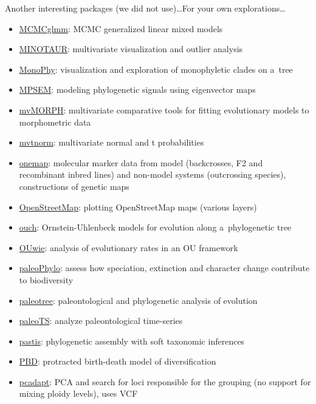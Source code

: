 \documentclass[compress, ucs, xelatex, 11pt, xcolor=svgnames, aspectratio=169,
	hyperref={
		bookmarks=true,
		unicode=true,
		colorlinks=true,
		pdftitle={Molecular data in R},
		plainpages=false,
		pdfauthor={Vojtech Zeisek},
		pdfsubject={Course about phylogeny and evolution in R},
		pdfcreator={XeLaTeX},
		pdfkeywords={R, evolution, phylogeny, molecular data},
		linkcolor=Crimson, %
		anchorcolor=Magenta, %
		citecolor=Magenta, %
		filecolor=Magenta, %
		menucolor=Magenta, %
		urlcolor=DodgerBlue, %
		pdftex},
	url={hyphens, lowtilde} %
	]{beamer}
\begin{document}
\begin{frame}[allowframebreaks]{Another interesting packages (we did not use)\ldots}{For your own explorations\ldots}
\begin{itemize}
		\item \href{https://CRAN.R-project.org/package=MCMCglmm}{MCMCglmm}: MCMC generalized linear mixed models
		\item \href{https://github.com/NESCent/MINOTAUR}{MINOTAUR}: multivariate visualization and outlier analysis
		\item \href{https://CRAN.R-project.org/package=MonoPhy}{MonoPhy}: visualization and exploration of monophyletic clades on a~tree
		\item \href{https://CRAN.R-project.org/package=MPSEM}{MPSEM}: modeling phylogenetic signals using eigenvector maps
		\item \href{https://CRAN.R-project.org/package=mvMORPH}{mvMORPH}: multivariate comparative tools for fitting evolutionary models to morphometric data
		\item \href{https://CRAN.R-project.org/package=mvtnorm}{mvtnorm}: multivariate normal and t probabilities
		\item \href{https://CRAN.R-project.org/package=onemap}{onemap}: molecular marker data from model (backcrosses, F2 and recombinant inbred lines) and non-model systems (outcrossing species), constructions of genetic maps
		\item \href{https://CRAN.R-project.org/package=OpenStreetMap}{OpenStreetMap}: plotting OpenStreetMap maps (various layers)
		\item \href{https://CRAN.R-project.org/package=ouch}{ouch}: Ornstein-Uhlenbeck models for evolution along a~phylogenetic tree
		\item \href{https://CRAN.R-project.org/package=OUwie}{OUwie}: analysis of evolutionary rates in an OU framework
		\item \href{https://r-forge.r-project.org/projects/paleophylo/}{paleoPhylo}: assess how speciation, extinction and character change contribute to biodiversity
		\item \href{https://CRAN.R-project.org/package=paleotree}{paleotree}: paleontological and phylogenetic analysis of evolution
		\item \href{https://CRAN.R-project.org/package=paleoTS}{paleoTS}: analyze paleontological time-series
		\item \href{https://CRAN.R-project.org/package=pastis}{pastis}: phylogenetic assembly with soft taxonomic inferences
		\item \href{https://CRAN.R-project.org/package=PBD}{PBD}: protracted birth-death model of diversification
		\item \href{https://CRAN.R-project.org/package=pcadapt}{pcadapt}: PCA and search for loci responsible for the grouping (no support for mixing ploidy levels), uses VCF

\end{itemize}
\end{frame}
\end{document}
